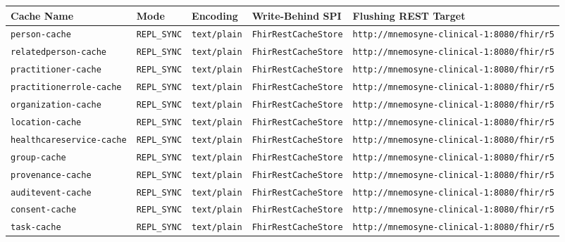 \begin{table}[htbp]
\centering
\scriptsize
\begin{tabularx}{\textwidth}{l l l l Y}
\toprule
\textbf{Cache Name} & \textbf{Mode} & \textbf{Encoding} & \textbf{Write-Behind SPI} & \textbf{Flushing REST Target} \\
\midrule
\texttt{person-cache} & \texttt{REPL\_SYNC} & \texttt{text/plain} & \texttt{FhirRestCacheStore} & \nolinkurl{http://mnemosyne-clinical-1:8080/fhir/r5} \\
\texttt{relatedperson-cache} & \texttt{REPL\_SYNC} & \texttt{text/plain} & \texttt{FhirRestCacheStore} & \nolinkurl{http://mnemosyne-clinical-1:8080/fhir/r5} \\
\texttt{practitioner-cache} & \texttt{REPL\_SYNC} & \texttt{text/plain} & \texttt{FhirRestCacheStore} & \nolinkurl{http://mnemosyne-clinical-1:8080/fhir/r5} \\
\texttt{practitionerrole-cache} & \texttt{REPL\_SYNC} & \texttt{text/plain} & \texttt{FhirRestCacheStore} & \nolinkurl{http://mnemosyne-clinical-1:8080/fhir/r5} \\
\texttt{organization-cache} & \texttt{REPL\_SYNC} & \texttt{text/plain} & \texttt{FhirRestCacheStore} & \nolinkurl{http://mnemosyne-clinical-1:8080/fhir/r5} \\
\texttt{location-cache} & \texttt{REPL\_SYNC} & \texttt{text/plain} & \texttt{FhirRestCacheStore} & \nolinkurl{http://mnemosyne-clinical-1:8080/fhir/r5} \\
\texttt{healthcareservice-cache} & \texttt{REPL\_SYNC} & \texttt{text/plain} & \texttt{FhirRestCacheStore} & \nolinkurl{http://mnemosyne-clinical-1:8080/fhir/r5} \\
\texttt{group-cache} & \texttt{REPL\_SYNC} & \texttt{text/plain} & \texttt{FhirRestCacheStore} & \nolinkurl{http://mnemosyne-clinical-1:8080/fhir/r5} \\
\texttt{provenance-cache} & \texttt{REPL\_SYNC} & \texttt{text/plain} & \texttt{FhirRestCacheStore} & \nolinkurl{http://mnemosyne-clinical-1:8080/fhir/r5} \\
\texttt{auditevent-cache} & \texttt{REPL\_SYNC} & \texttt{text/plain} & \texttt{FhirRestCacheStore} & \nolinkurl{http://mnemosyne-clinical-1:8080/fhir/r5} \\
\texttt{consent-cache} & \texttt{REPL\_SYNC} & \texttt{text/plain} & \texttt{FhirRestCacheStore} & \nolinkurl{http://mnemosyne-clinical-1:8080/fhir/r5} \\
\texttt{task-cache} & \texttt{REPL\_SYNC} & \texttt{text/plain} & \texttt{FhirRestCacheStore} & \nolinkurl{http://mnemosyne-clinical-1:8080/fhir/r5} \\

\end{tabularx}
\end{table}
